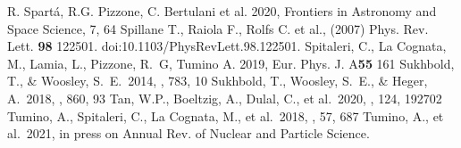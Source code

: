 \documentclass{aastex631}
\begin{document}
\begin{thebibliography}{(dummy)}
 R. Spart\'a, R.G. Pizzone, C. Bertulani et al. 2020, Frontiers in Astronomy and Space Science, 7, 64
 Spillane T., Raiola F., Rolfs C. et al., (2007)  Phys. Rev. Lett. {\bf98} 122501. doi:10.1103/PhysRevLett.98.122501.
 Spitaleri, C.,  La Cognata, M., Lamia, L., Pizzone, R.~G, Tumino A. 2019, Eur. Phys. J. A{\bf 55 } 161
 Sukhbold, T., \& Woosley, S.~E.\ 2014, \apj, 783, 10
 Sukhbold, T., Woosley, S.~E., \& Heger, A.\ 2018, \apj, 860, 93
 Tan, W.P., Boeltzig, A., Dulal, C., et al.\ 2020, \prl, 124, 192702
 Tumino, A., Spitaleri, C., La Cognata, M., et al.\ 2018, \nat, 57, 687
 Tumino, A., et al.\ 2021, in press on Annual Rev. of Nuclear and Particle Science.



\end{thebibliography}
\end{document}
